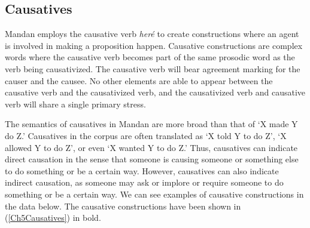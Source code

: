 \subsection{Causatives}\label{Ch5SubSecCausatives}

Mandan employs the causative verb \textit{heré} to create constructions where an agent is involved in making a proposition happen. Causative constructions are complex words where the causative verb becomes part of the same prosodic word as the verb being causativized. The causative verb will bear agreement marking for the causer and the causee. No other elements are able to appear between the causative verb and the causativized verb, and the causativized verb and causative verb will share a single primary stress.

The semantics of causatives in Mandan are more broad than that of `X made Y do Z.' Causatives in the corpus are often translated as `X told Y to do Z', `X allowed Y to do Z', or even `X wanted Y to do Z.' Thus, causatives can indicate direct causation in the sense that someone is causing someone or something else to do something or be a certain way. However, causatives can also indicate indirect causation, as someone may ask or implore or require someone to do something or be a certain way. We can see examples of causative constructions in the data below. The causative constructions have been shown in (\ref{Ch5Causatives}) in bold.

